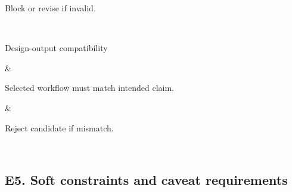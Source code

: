 {\begin{longtable}
\begin{minipage}[t]{\linewidth}
Block or revise if invalid.
\end{minipage} \\
\hline
\begin{minipage}[t]{\linewidth}\RaggedRight\hspace{0pt}
Design-output compatibility
\end{minipage} & \begin{minipage}[t]{\linewidth}\RaggedRight\hspace{0pt}
Selected workflow must match intended claim.
\end{minipage} & \begin{minipage}[t]{\linewidth}\RaggedRight\hspace{0pt}
Reject candidate if mismatch.
\end{minipage} \\
\end{longtable}
}

\subsection{\texorpdfstring{\textbf{E5. Soft constraints and caveat requirements}}{E5. Soft constraints and caveat requirements}}\label{e5.-soft-constraints-and-caveat-requirements}

